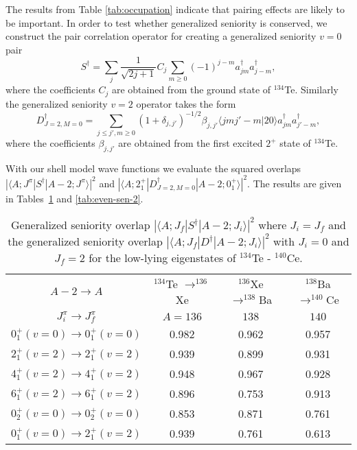 The results from Table \ref{tab:occupation} indicate that
pairing effects are likely to be important. In order to test
whether generalized seniority is conserved, we construct the pair correlation 
operator for creating a generalized seniority $v=0$ pair
\begin{equation}
     S^{\dagger} = \sum_{j} \frac{1}{\sqrt{2j + 1}} C_{j} \sum_{m \geq 0}
                   (-1)^{j-m} a^{\dagger}_{jm} a^{\dagger}_{j-m},
\end{equation}
where the coefficients $C_{j}$ are obtained from the ground state of
$^{134}$Te. Similarly the generalized seniority $v=2$ operator takes the
form
\begin{equation}
    D^{\dagger}_{J=2,M=0} = \sum_{j \leq j',m\geq 0} (1+\delta_{j,j'})^{-1/2}
                            \beta_{j,j'}\langle jmj'-m|20\rangle 
                            a^{\dagger}_{jm} a^{\dagger}_{j'-m},
\end{equation}
where the coefficients $\beta_{j,j'}$ are obtained from the first excited 
$2^{+}$ state of $^{134}$Te. 

With our shell model wave functions we evaluate the squared overlaps
$|\langle A; J^{\pi}| S^{\dagger} | A-2; J^{\pi} \rangle |^{2}$ and
$|\langle A; 2^{+}_{1}| D^{\dagger}_{J=2, M=0}| A-2; 0^{+}_{1} \rangle |^{2}$.
The results are given in Tables\ \ref{tab:even-sen-1} 
and \ref{tab:even-sen-2}.

\begin{table}[htbp]
\begin{center}
\caption{Generalized seniority overlap 
$|\langle A;J_{f}|S^{\dagger}|A-2;J_{i}\rangle |^{2}$ where $J_{i} = J_{f}$
and the generalized seniority overlap 
$|\langle A; J_{f}|D^{\dagger}|A-2;J_{i}\rangle |^{2}$ with $J_{i} = 0$ and
$J_{f} = 2$ for the low-lying eigenstates of $^{134}$Te - $^{140}$Ce.}
\begin{tabular}{cccc}
\hline
$A-2 \rightarrow A$ & $^{134}$Te $\rightarrow ^{136}$Xe & 
$^{136}$Xe $\rightarrow ^{138}$Ba & $^{138}$Ba $\rightarrow ^{140}$Ce \\
$J_{i}^{\pi} \rightarrow J_{f}^{\pi}$  & $A=136$ & $138$ & $140$ \\
\hline
$0^{+}_{1}(v=0) \rightarrow 0^{+}_{1}(v=0)$ & 0.982   & 0.962   & 0.957   \\
$2^{+}_{1}(v=2) \rightarrow 2^{+}_{1}(v=2)$ & 0.939   & 0.899   & 0.931   \\
$4^{+}_{1}(v=2) \rightarrow 4^{+}_{1}(v=2)$ & 0.948   & 0.967   & 0.928   \\
$6^{+}_{1}(v=2) \rightarrow 6^{+}_{1}(v=2)$ & 0.896   & 0.753   & 0.913   \\
$0^{+}_{2}(v=0) \rightarrow 0^{+}_{2}(v=0)$ & 0.853   & 0.871   & 0.761   \\
$0^{+}_{1}(v=0) \rightarrow 2^{+}_{1}(v=2)$ & 0.939   & 0.761   & 0.613   \\
\hline
\end{tabular}
\label{tab:even-sen-1}
\end{center}
\end{table}

